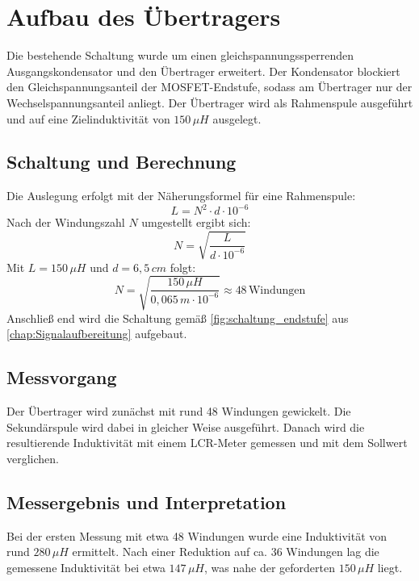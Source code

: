 \section{Aufbau des Übertragers}
\label{chap:uebertrager}
Die bestehende Schaltung wurde um einen gleichspannungssperrenden Ausgangskondensator und den Übertrager erweitert. Der Kondensator blockiert den Gleichspannungsanteil der MOSFET-Endstufe, sodass am Übertrager nur der Wechselspannungsanteil anliegt. Der Übertrager wird als Rahmenspule ausgeführt und auf eine Zielinduktivität von $150\,\mu H$ ausgelegt.

\subsection{Schaltung und Berechnung}
Die Auslegung erfolgt mit der Näherungsformel für eine Rahmenspule:
\[
  L = N^2 \cdot d \cdot 10^{-6}
\]
Nach der Windungszahl $N$ umgestellt ergibt sich:
\[
  N = \sqrt{\frac{L}{d \cdot 10^{-6}}}
\]
Mit $L=150\,\mu H$ und $d=6{,}5\,cm$ folgt:
\[
  N = \sqrt{\frac{150\,\mu H}{0{,}065\,m \cdot 10^{-6}}} \approx 48 \,\text{Windungen}
\]
Anschließ end wird die Schaltung gemäß \cref{fig:schaltung_endstufe} aus \cref{chap:Signalaufbereitung} aufgebaut.

\subsection{Messvorgang}
Der Übertrager wird zunächst mit rund 48 Windungen gewickelt. Die Sekundärspule wird dabei in gleicher Weise ausgeführt. Danach wird die resultierende Induktivität mit einem LCR-Meter gemessen und mit dem Sollwert verglichen.

\subsection{Messergebnis und Interpretation}
Bei der ersten Messung mit etwa 48 Windungen wurde eine Induktivität von rund $280\,\mu H$ ermittelt. Nach einer Reduktion auf ca. 36 Windungen lag die gemessene Induktivität bei etwa $147\,\mu H$, was nahe der geforderten $150\,\mu H$ liegt.


